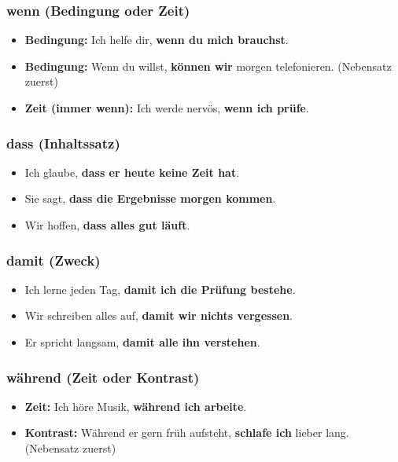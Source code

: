 \documentclass[a4paper,12pt]{article}
\begin{document}
            \subsubsection{wenn (Bedingung oder Zeit)}
            \begin{itemize}[leftmargin=2em]
					\item \textbf{Bedingung:} Ich helfe dir, \textbf{wenn du mich brauchst}.
                    \item \textbf{Bedingung:} Wenn du willst, \textbf{k\"onnen wir} morgen telefonieren. (Nebensatz zuerst)
                    \item \textbf{Zeit (immer wenn):} Ich werde nerv\"os, \textbf{wenn ich pr\"ufe}.
                \end{itemize}
            
            \subsubsection{dass (Inhaltssatz)}
            \begin{itemize}[leftmargin=2em]
					\item Ich glaube, \textbf{dass er heute keine Zeit hat}.
                    \item Sie sagt, \textbf{dass die Ergebnisse morgen kommen}.
                    \item Wir hoffen, \textbf{dass alles gut l\"auft}.
                \end{itemize}
            
            \subsubsection{damit (Zweck)}
            \begin{itemize}[leftmargin=2em]
					\item Ich lerne jeden Tag, \textbf{damit ich die Pr\"ufung bestehe}.
                    \item Wir schreiben alles auf, \textbf{damit wir nichts vergessen}.
                    \item Er spricht langsam, \textbf{damit alle ihn verstehen}.
                \end{itemize}
            
            \subsubsection{w\"ahrend (Zeit oder Kontrast)}
            \begin{itemize}[leftmargin=2em]
					\item \textbf{Zeit:} Ich h\"ore Musik, \textbf{w\"ahrend ich arbeite}.
                    \item \textbf{Kontrast:} W\"ahrend er gern fr\"uh aufsteht, \textbf{schlafe ich} lieber lang. (Nebensatz zuerst)
                \end{itemize}
            
\end{document}
